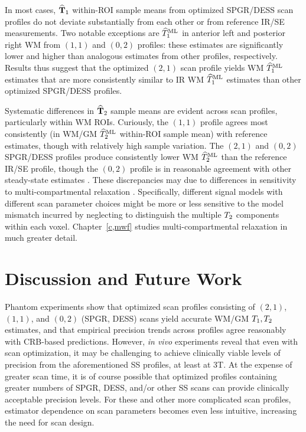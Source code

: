 In most cases, $\widehat{\mathbf{T}}_1$ within-ROI sample means 
from optimized SPGR/DESS scan profiles 
do not deviate substantially from each other 
or from reference IR/SE measurements.
Two notable exceptions are $\widehat{T}_1^\mathrm{ML}$ 
in anterior left and posterior right WM 
from $(1,1)$ and $(0,2)$ profiles: 
these estimates are significantly lower and higher 
than analogous estimates from other profiles, respectively.
Results thus suggest that the optimized $(2,1)$ scan profile 
yields WM $\widehat{T}_1^\mathrm{ML}$ estimates 
that are more consistently similar to IR WM $\widehat{T}_1^\mathrm{ML}$ estimates 
than other optimized SPGR/DESS profiles.

Systematic differences in $\widehat{\mathbf{T}}_2$ sample means 
are evident across scan profiles, 
particularly within WM ROIs.
Curiously, the $(1,1)$ profile agrees most consistently 
(in WM/GM $\widehat{T}_2^\mathrm{ML}$ within-ROI sample mean) 
with reference estimates, 
though with relatively high sample variation.
The $(2,1)$ and $(0,2)$ SPGR/DESS profiles 
produce consistently lower WM $\widehat{T}_2^\mathrm{ML}$ 
than the reference IR/SE profile, 
though the $(0,2)$ profile is in reasonable agreement 
with other steady-state estimates \cite{heule:14:tes-nib}.
These discrepancies may due to differences 
in sensitivity to multi-compartmental relaxation \cite{mackay:94:ivv}.
Specifically, different signal models 
with different scan parameter choices 
might be more or less sensitive 
to the model mismatch incurred 
by neglecting to distinguish 
the multiple $T_2$ components within each voxel.
Chapter~\ref{c,mwf} studies multi-compartmental relaxation 
in much greater detail.

\section{Discussion and Future Work}
\label{s,scn-dsgn,disc}

Phantom experiments show 
that optimized scan profiles consisting 
of $(2,1)$, $(1,1)$, and $(0,2)$ (SPGR, DESS) scans 
yield accurate WM/GM $T_1,T_2$ estimates, 
and that empirical precision trends across profiles agree reasonably 
with CRB-based predictions.
However, \emph{in vivo} experiments reveal 
that even with scan optimization, 
it may be challenging to achieve clinically viable levels 
of precision from the aforementioned SS profiles, at least at 3T. 
At the expense of greater scan time, 
it is of course possible that optimized profiles 
containing greater numbers of SPGR, DESS, and/or other SS scans 
can provide clinically acceptable precision levels.
For these and other more complicated scan profiles, 
estimator dependence on scan parameters becomes even less intuitive, 
increasing the need for scan design.

